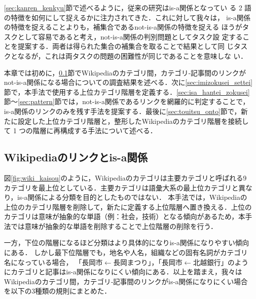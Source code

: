 \documentclass[japanese]{jnlp_1.4}
\begin{document}
\ref{sec:kanren_kenkyu}節で述べるように，従来の研究はis-a関係となってい
る 2 語の特徴を如何にして捉えるかに注力されてきた．これに対して我々は，
is-a関係の特徴を捉えることよりも，補集合であるnot-is-a関係の特徴を捉える
ほうがタスクとして容易であると考え，not-is-a関係の判別問題としてタスク設
定することを提案する．両者は得られた集合の補集合を取ることで結果として同
じタスクとなるが，これは両タスクの問題の困難性が同じであることを意味しな
い．

本章では初めに，\ref{sec:link_survey}節でWikipediaのカテゴリ間，カテゴリ‐記事間のリンクがnot-is-a関係になる場合についての調査結果を述べる．次に\ref{sec:imizokusei_settei}節で，本手法で使用する上位カテゴリ階層を定義する．\ref{sec:isa_hantei_zokusei}節〜\ref{sec:pattern}節では，not-is-a関係であるリンクを網羅的に判定することで，is-a関係のリンクのみを残す手法を提案する．最後に\ref{sec:touitsu_onto}節で，新たに設定した上位カテゴリ階層と，整形したWikipediaのカテゴリ階層を接続して 1 つの階層に再構成する手法について述べる．


\subsection{Wikipediaのリンクとis-a関係}
\label{sec:link_survey}

図\ref{fig:wiki_kaisou}のように，Wikipediaのカテゴリは主要カテゴリと呼ばれる9カテゴリを最上位としている．主要カテゴリは語彙大系の最上位カテゴリと異なり，is-a関係による分類を目的としたものではない．
本手法では，Wikipediaの上位のカテゴリ階層を削除して，新たに定義する上位階層へ置き換える．上位のカテゴリは意味が抽象的な単語（例：社会，技術）となる傾向があるため，本手法では意味が抽象的な単語を削除することで上位階層の削除を行う．

一方，下位の階層になるほど分類はより具体的になりis-a関係になりやすい傾向にある．
しかし最下位階層でも，地名や人名，組織などの固有名詞がカテゴリ名になっている場合，
「長岡市$\gets$長岡まつり」，「長岡市$\gets$北越銀行」のようにカテゴリと記事はis-a関係になりにくい傾向にある．以上を踏まえ，我々はWikipediaのカテゴリ間，カテゴリ‐記事間のリンクがis-a関係になりにくい場合を以下の3種類の規則にまとめた．
\pagebreak
\end{document}
